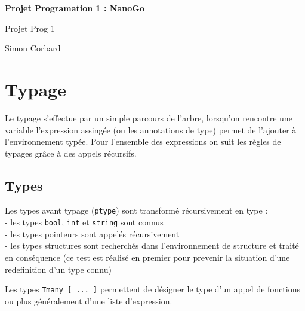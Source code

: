 \documentclass[11pt,a4paper]{article}
\begin{document}
\begin{titlepage}

\vspace{1cm}

	\begin{center}

    \huge{\textbf{Projet Programation 1 : NanoGo}}

		\vspace{5mm} %

		\begin{large}

		Projet Prog 1

		\vspace{5mm}

		Simon Corbard

		\end{large}

	\end{center}

\vfill

\tableofcontents

\end{titlepage}

\section{Typage}

Le typage s'effectue par un simple parcours de l'arbre, lorsqu'on rencontre une variable l'expression assingée (ou les annotations de type) permet de l'ajouter à l'environnement typée. Pour l'ensemble des expressions on suit les règles de typages grâce à des appels récursifs.

\subsection{Types}

Les types avant typage (\verb|ptype|) sont transformé récursivement en type : \\
 - les types \verb|bool|, \verb|int| et \verb|string| sont connus \\
 - les types pointeurs sont appelés récursivement \\
 - les types structures sont recherchés dans l'environnement de structure et traité en conséquence (ce test est réalisé en premier pour prevenir la situation d'une redefinition d'un type connu)

Les types \verb|Tmany [ ... ]| permettent de désigner le type d'un appel de fonctions ou plus généralement d'une liste d'expression.
\end{document}
